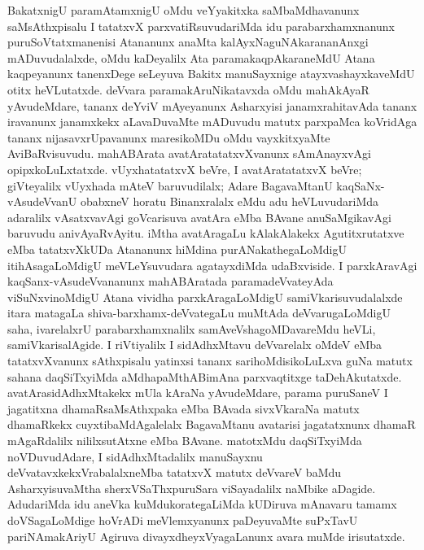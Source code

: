 BakatxnigU paramAtamxnigU oMdu veYyakitxka saMbaMdhavanunx saMsAthxpisalu I tatatxvX parxvatiRsuvudariMda idu parabarxhamxnanunx puruSoVtatxmanenisi Atananunx anaMta kalAyxNa\-guNAkarananAnxgi mADuvudalalxde, oMdu kaDeyalilx Ata paramakaqpAkaraneMdU Atana kaqpeyanunx tanenxDege seLeyuva Bakitx manuSayxnige atayxvashayxkaveMdU otitx heVLutatxde. deVvara paramakAruNikatavxda oMdu mahAkAyaR yAvudeMdare, tananx deYviV mAye\-yanunx Asharxyisi janamxrahitavAda tananx iravanunx janamxkekx aLavaDuvaMte mADuvudu matutx parxpaMca koVridAga tananx nijasavxrUpavanunx maresikoMDu oMdu vayxkitxyaMte AviBaRvisuvudu. mahABArata avatAratatatxvXvanunx sAmAnayxvAgi opipxkoLuLxtatxde. vUyxhatatatxvX beVre, I avatAratatatxvX beVre; giVteyalilx vUyxhada mAteV baruvudilalx; Adare BagavaMtanU kaqSaNx-vAsudeVvanU obabxneV horatu Binanxralalx eMdu adu heVLuvudariMda adaralilx vAsatxvavAgi goVcarisuva avatAra eMba BAvane anuSaMgika\-vAgi baruvudu anivAyaRvAyitu. iMtha avatAragaLu kAlakAlakekx Agutitxru\-tatxve eMba tatatxvXkUDa Atananunx hiMdina purANakathegaLoMdigU itihAsagaLoMdigU meVLeYsuvudara agatayxdiMda udaBxviside. I parxkAravAgi kaqSanx-vAsudeVvananunx mahA\-BAratada paramadeVvateyAda viSuNxvinoMdigU Atana vividha parxkAragaLoMdigU samiVkarisuvudalalxde itara matagaLa shiva-barxhamx-deVvategaLu muMtAda deVvaru\-gaLoMdigU saha, ivarelalxrU parabarxhamxnalilx samAveVshagoMDavareMdu heVLi, samiV\-karisalAgide. I riVtiyalilx I sidAdhxMtavu deVvarelalx oMdeV eMba tatatxvXvanunx sAthxpi\-salu yatinxsi tananx sarihoMdisikoLuLxva guNa matutx sahana daqSiTxyiMda aMdhapaMthABimAna parxvaqtitxge taDehAkutatxde. avatArasidAdhxMtakekx mUla kAraNa yAvudeMdare, parama puru\-SaneV I jagatitxna dhamaRsaMsAthxpaka eMba BAvada sivxVkaraNa matutx dhamaRkekx cuyxti\-baMdAgalelalx BagavaMtanu avatarisi jagatatxnunx dhamaR mAgaRdalilx nililxsutAtxne eMba BAvane. matotxMdu daqSiTxyiMda noVDuvudAdare, I sidAdhxMtadalilx manuSayxnu deVvatavxkekxVrabalalxneMba tatatxvX matutx deVvareV baMdu AsharxyisuvaMtha sherxVSaThxpuruSara viSayadalilx naMbike aDagide. AdudariMda idu aneVka kuMdukorategaLiMda kUDi\-ruva mAnavaru tamamx doVSagaLoMdige hoVrADi meVlemxyanunx paDeyuvaMte suPxTavU pariNAmakAriyU Agiruva divayxdheyxVyagaLanunx avara muMde irisutatxde.

\theendnotes
{}
